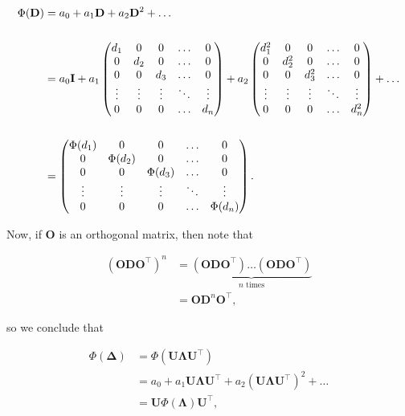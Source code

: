 \begin{align} %
    \Phi(\mathbf D) &= a_0 + a_1 \mathbf D + a_2 \mathbf D^2 + \dots \notag \\
    \notag \\
    &= a_0 \mathbf I + a_1 
    \begin{pmatrix}
        d_1 & 0 & 0 & \ldots & 0 \\
        0 & d_2 & 0 & \ldots & 0 \\
        0 & 0 & d_3 & \ldots & 0 \\
        \vdots & \vdots & \vdots & \ddots & \vdots \\
        0 & 0 & 0 & \ldots & d_n
    \end{pmatrix}
    + a_2
    \begin{pmatrix}
        d_1^2 & 0 & 0 & \ldots & 0 \\
        0 & d_2^2 & 0 & \ldots & 0 \\
        0 & 0 & d_3^2 & \ldots & 0 \\
        \vdots & \vdots & \vdots & \ddots & \vdots \\
        0 & 0 & 0 & \ldots & d_n^2
    \end{pmatrix}
    + \dots \notag \\
    \notag \\
    &= 
    \begin{pmatrix}
        \Phi(d_1) & 0 & 0 & \ldots & 0 \\
        0 & \Phi(d_2) & 0 & \ldots & 0 \\
        0 & 0 & \Phi(d_3) & \ldots & 0 \\
        \vdots & \vdots & \vdots & \ddots & \vdots \\
        0 & 0 & 0 & \ldots & \Phi(d_n)
    \end{pmatrix} \label{eq:diag}.
\end{align}

Now, if $\mathbf O$ is an orthogonal matrix, then note that

\begin{align*}
    (\mathbf{ODO}^\intercal)^n &= \underbrace{(\mathbf{ODO}^\intercal)\dots(\mathbf{ODO}^\intercal)}_{n \text{ times}}\\
    &= \mathbf{O}\mathbf D^n \mathbf{O}^\intercal,
\end{align*}

so we conclude that

\begin{align*}
    \Phi(\mathbf \Delta) &= \Phi(\mathbf{U \Lambda U}^\intercal) \\
    &= a_0 + a_1 \mathbf{U \Lambda U}^\intercal + a_2 (\mathbf{U \Lambda U}^\intercal)^2 + \dots\\
    &= \mathbf U \Phi(\mathbf \Lambda) \mathbf{U}^\intercal,
\end{align*}

